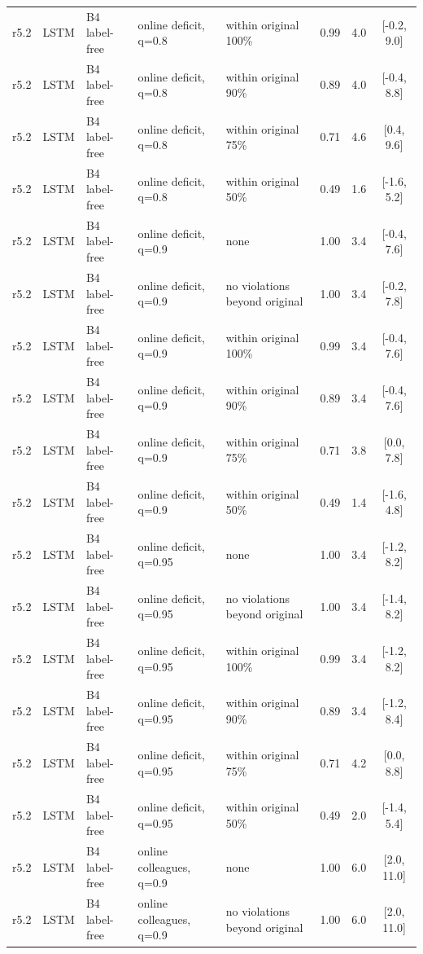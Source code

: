 \documentclass[10pt,onecolumn,letterpaper]{article}
\begin{document}
\begin{longtable}{lllp{4.2cm}p{3.4cm}ccc}
r5.2 & LSTM & B4 label-free & online deficit, q=0.8 & within original 100\% & 0.99 & 4.0 & [-0.2, 9.0] \\
r5.2 & LSTM & B4 label-free & online deficit, q=0.8 & within original 90\% & 0.89 & 4.0 & [-0.4, 8.8] \\
r5.2 & LSTM & B4 label-free & online deficit, q=0.8 & within original 75\% & 0.71 & 4.6 & [0.4, 9.6] \\
r5.2 & LSTM & B4 label-free & online deficit, q=0.8 & within original 50\% & 0.49 & 1.6 & [-1.6, 5.2] \\
r5.2 & LSTM & B4 label-free & online deficit, q=0.9 & none & 1.00 & 3.4 & [-0.4, 7.6] \\
r5.2 & LSTM & B4 label-free & online deficit, q=0.9 & no violations beyond original & 1.00 & 3.4 & [-0.2, 7.8] \\
r5.2 & LSTM & B4 label-free & online deficit, q=0.9 & within original 100\% & 0.99 & 3.4 & [-0.4, 7.6] \\
r5.2 & LSTM & B4 label-free & online deficit, q=0.9 & within original 90\% & 0.89 & 3.4 & [-0.4, 7.6] \\
r5.2 & LSTM & B4 label-free & online deficit, q=0.9 & within original 75\% & 0.71 & 3.8 & [0.0, 7.8] \\
r5.2 & LSTM & B4 label-free & online deficit, q=0.9 & within original 50\% & 0.49 & 1.4 & [-1.6, 4.8] \\
r5.2 & LSTM & B4 label-free & online deficit, q=0.95 & none & 1.00 & 3.4 & [-1.2, 8.2] \\
r5.2 & LSTM & B4 label-free & online deficit, q=0.95 & no violations beyond original & 1.00 & 3.4 & [-1.4, 8.2] \\
r5.2 & LSTM & B4 label-free & online deficit, q=0.95 & within original 100\% & 0.99 & 3.4 & [-1.2, 8.2] \\
r5.2 & LSTM & B4 label-free & online deficit, q=0.95 & within original 90\% & 0.89 & 3.4 & [-1.2, 8.4] \\
r5.2 & LSTM & B4 label-free & online deficit, q=0.95 & within original 75\% & 0.71 & 4.2 & [0.0, 8.8] \\
r5.2 & LSTM & B4 label-free & online deficit, q=0.95 & within original 50\% & 0.49 & 2.0 & [-1.4, 5.4] \\
r5.2 & LSTM & B4 label-free & online colleagues, q=0.9 & none & 1.00 & 6.0 & [2.0, 11.0] \\
r5.2 & LSTM & B4 label-free & online colleagues, q=0.9 & no violations beyond original & 1.00 & 6.0 & [2.0, 11.0] \\

\end{longtable}
\end{document}
